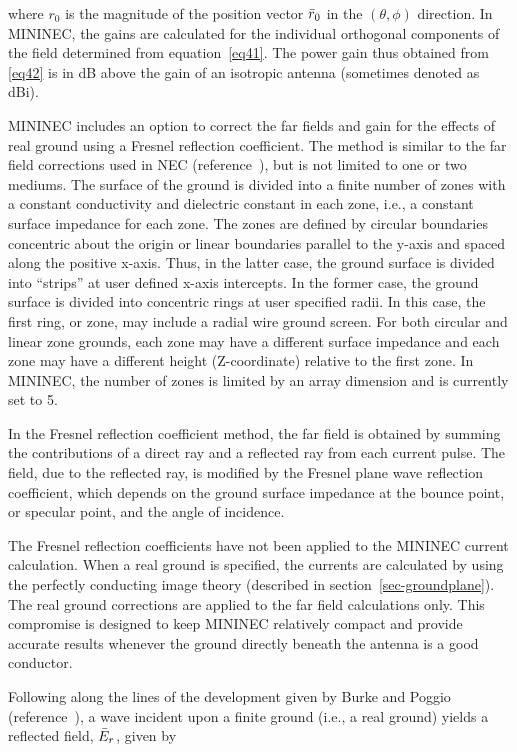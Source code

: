 \documentclass[12pt]{article}
\begin{document}
where $r_0$ is the magnitude of the position vector $\bar{r}_0$ in the
$(\theta,\phi)$ direction. In MININEC, the gains are calculated for the
individual orthogonal components of the field determined from
equation~\eqref{eq41}. The power gain thus obtained from \eqref{eq42} is
in dB above the gain of an isotropic antenna (sometimes denoted as dBi).

MININEC includes an option to correct the far fields and gain for the
effects of real ground using a Fresnel reflection coefficient. The
method is similar to the far field corrections used in NEC
(reference~\cite{r4}), but is not limited to one or two mediums. The
surface of the ground is divided into a finite number of zones with a
constant conductivity and dielectric constant in each zone, i.e., a
constant surface impedance for each zone. The zones are defined by
circular boundaries concentric about the origin or linear boundaries
parallel to the y-axis and spaced along the positive x-axis. Thus, in
the latter case, the ground surface is divided into ``strips'' at user
defined x-axis intercepts. In the former case, the ground surface is
divided into concentric rings at user specified radii. In this case, the
first ring, or zone, may include a radial wire ground screen. For both
circular and linear zone grounds, each zone may have a different surface
impedance and each zone may have a different height (Z-coordinate)
relative to the first zone. In MININEC, the number of zones is limited
by an array dimension and is currently set to 5.

In the Fresnel reflection coefficient method, the far field is obtained
by summing the contributions of a direct ray and a reflected ray from
each current pulse. The field, due to the reflected ray, is modified by
the Fresnel plane wave reflection coefficient, which depends on the
ground surface impedance at the bounce point, or specular point, and the
angle of incidence.

The Fresnel reflection coefficients have not been applied to the MININEC
current calculation. When a real ground is specified, the currents are
calculated by using the perfectly conducting image theory (described in
section~\ref{sec-groundplane}). The real ground corrections are applied
to the far field calculations only. This compromise is designed to keep
MININEC relatively compact and provide accurate results whenever the
ground directly beneath the antenna is a good conductor.

Following along the lines of the development given by Burke and Poggio
(reference~\cite{r4}), a wave incident upon a finite ground (i.e., a
real ground) yields a reflected field, $\bar{E}_r$, given by
\end{document}
